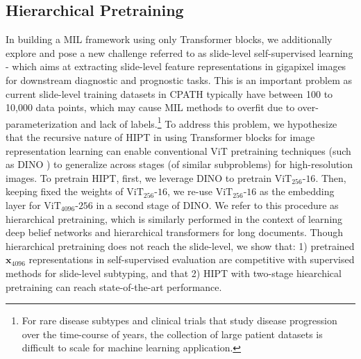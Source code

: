 {\subsection{Hierarchical Pretraining}

In building a MIL framework using only Transformer blocks, we additionally explore and pose a new challenge referred to as slide-level self-supervised learning - which aims at extracting slide-level feature representations in gigapixel images for downstream diagnostic and prognostic tasks. This is an important problem as current slide-level training datasets in CPATH typically have between 100 to 10,000 data points, which may cause MIL methods to overfit due to over-parameterization and lack of labels.\footnote{For rare disease subtypes and clinical trials that study disease progression over the time-course of years, the collection of large patient datasets is difficult to scale for machine learning application.} To address this problem, we hypothesize that the recursive nature of HIPT in using Transformer blocks for image representation learning can enable conventional ViT pretraining techniques (such as DINO \cite{caron2021emerging}) to generalize across stages (of similar subproblems) for high-resolution images. To pretrain HIPT, first, we leverage DINO to pretrain $\operatorname{ViT_{256}\textrm{-}16}$. Then, keeping fixed the weights of $\operatorname{ViT_{256}\textrm{-}16}$, we re-use $\operatorname{ViT_{256}\textrm{-}16}$ as the embedding layer for $\operatorname{ViT_{4096}\textrm{-}256}$ in a second stage of DINO. We refer to this procedure as hierarchical pretraining, which is similarly performed in the context of learning deep belief networks \cite{erhan2010does} and hierarchical transformers for long documents\cite{zhang-etal-2019-hibert}. Though hierarchical pretraining does not reach the slide-level, we show that: 1) pretrained $\textbf{x}_{4096}$ representations in self-supervised evaluation are competitive with supervised methods for slide-level subtyping, and that 2) HIPT with two-stage hiearchical pretraining can reach state-of-the-art performance.

}
